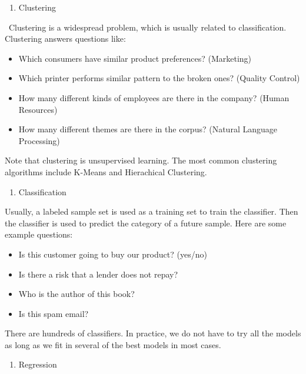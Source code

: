 \documentclass[
]{article}
\providecommand{\tightlist}{%
  \setlength{\itemsep}{0pt}\setlength{\parskip}{0pt}}
\begin{document}
\begin{enumerate}
\def\labelenumi{\arabic{enumi}.}
\setcounter{enumi}{2}
\tightlist
\item
  Clustering
\end{enumerate}

~Clustering is a widespread problem, which is usually related to
classification. Clustering answers questions like:

\begin{itemize}
\tightlist
\item
  Which consumers have similar product preferences? (Marketing)
\item
  Which printer performs similar pattern to the broken ones? (Quality
  Control)
\item
  How many different kinds of employees are there in the company? (Human
  Resources)
\item
  How many different themes are there in the corpus? (Natural Language
  Processing)
\end{itemize}

Note that clustering is unsupervised learning. The most common
clustering algorithms include K-Means and Hierachical Clustering.

\begin{enumerate}
\def\labelenumi{\arabic{enumi}.}
\setcounter{enumi}{3}
\tightlist
\item
  Classification
\end{enumerate}

Usually, a labeled sample set is used as a training set to train the
classifier. Then the classifier is used to predict the category of a
future sample. Here are some example questions:

\begin{itemize}
\tightlist
\item
  Is this customer going to buy our product? (yes/no)
\item
  Is there a risk that a lender does not repay?
\item
  Who is the author of this book?
\item
  Is this spam email?
\end{itemize}

There are hundreds of classifiers. In practice, we do not have to try
all the models as long as we fit in several of the best models in most
cases.

\begin{enumerate}
\def\labelenumi{\arabic{enumi}.}
\setcounter{enumi}{4}
\tightlist
\item
  Regression
\end{enumerate}
\end{document}
